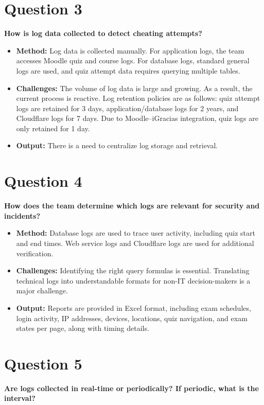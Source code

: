 \section*{Question 3}
\textbf{How is log data collected to detect cheating attempts?}

\begin{itemize}
	\item \textbf{Method:} Log data is collected manually. For application logs, the team accesses Moodle quiz and course logs. For database logs, standard general logs are used, and quiz attempt data requires querying multiple tables.
	\item \textbf{Challenges:} The volume of log data is large and growing. As a result, the current process is reactive. Log retention policies are as follows: quiz attempt logs are retained for 3 days, application/database logs for 2 years, and Cloudflare logs for 7 days. Due to Moodle–iGracias integration, quiz logs are only retained for 1 day.
	\item \textbf{Output:} There is a need to centralize log storage and retrieval.
\end{itemize}

\section*{Question 4}
\textbf{How does the team determine which logs are relevant for security and incidents?}

\begin{itemize}
	\item \textbf{Method:} Database logs are used to trace user activity, including quiz start and end times. Web service logs and Cloudflare logs are used for additional verification.
	\item \textbf{Challenges:} Identifying the right query formulas is essential. Translating technical logs into understandable formats for non-IT decision-makers is a major challenge.
	\item \textbf{Output:} Reports are provided in Excel format, including exam schedules, login activity, IP addresses, devices, locations, quiz navigation, and exam states per page, along with timing details.
\end{itemize}

\section*{Question 5}
\textbf{Are logs collected in real-time or periodically? If periodic, what is the interval?}

